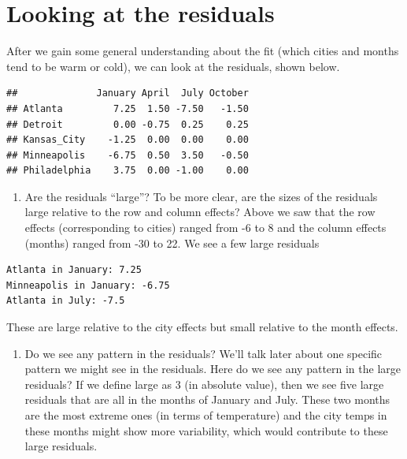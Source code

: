 \documentclass[
]{book}
\newenvironment{Shaded}{\begin{snugshade}}{\end{snugshade}}
\newcommand{\NormalTok}[1]{#1}
\newcommand{\SpecialCharTok}[1]{\textcolor[rgb]{0.00,0.00,0.00}{#1}}
\providecommand{\tightlist}{%
  \setlength{\itemsep}{0pt}\setlength{\parskip}{0pt}}
\begin{document}
\hypertarget{looking-at-the-residuals-1}{%
\section{Looking at the residuals}\label{looking-at-the-residuals-1}}

After we gain some general understanding about the fit (which cities and months tend to be warm or cold), we can look at the residuals, shown below.

\begin{Shaded}
\end{Shaded}

\begin{verbatim}
##              January April  July October
## Atlanta         7.25  1.50 -7.50   -1.50
## Detroit         0.00 -0.75  0.25    0.25
## Kansas_City    -1.25  0.00  0.00    0.00
## Minneapolis    -6.75  0.50  3.50   -0.50
## Philadelphia    3.75  0.00 -1.00    0.00
\end{verbatim}

\begin{enumerate}
\def\labelenumi{\arabic{enumi}.}
\tightlist
\item
  Are the residuals ``large''? To be more clear, are the sizes of the residuals large relative to the row and column effects? Above we saw that the row effects (corresponding to cities) ranged from -6 to 8 and the column effects (months) ranged from -30 to 22. We see a few large residuals
\end{enumerate}

\begin{verbatim}
Atlanta in January: 7.25
Minneapolis in January: -6.75
Atlanta in July: -7.5
\end{verbatim}

These are large relative to the city effects but small relative to the month effects.

\begin{enumerate}
\def\labelenumi{\arabic{enumi}.}
\setcounter{enumi}{1}
\tightlist
\item
  Do we see any pattern in the residuals? We'll talk later about one specific pattern we might see in the residuals. Here do we see any pattern in the large residuals? If we define large as 3 (in absolute value), then we see five large residuals that are all in the months of January and July. These two months are the most extreme ones (in terms of temperature) and the city temps in these months might show more variability, which would contribute to these large residuals.
\end{enumerate}
\end{document}
